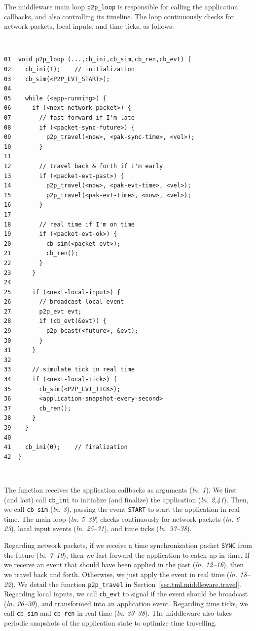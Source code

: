 \documentclass[sn-mathphys,iicol]{sn-jnl}%
\newcommand{\code}[1]  {\texttt{\small{#1}}}
\newcommand{\lin}[1]{(\emph{ln. #1}\xspace)}
\begin{document}
The middleware main loop \code{p2p\_loop} is responsible for calling the
application callbacks, and also controlling its timeline.
The loop continuously checks for network packets, local inputs, and time ticks,
as follows:

{\footnotesize
~
\begin{verbatim}
01  void p2p_loop (...,cb_ini,cb_sim,cb_ren,cb_evt) {
02    cb_ini(1);    // initialization
03    cb_sim(<P2P_EVT_START>);
04
05    while (<app-running>) {
06      if (<next-network-packet>) {
07        // fast forward if I'm late
08        if (<packet-sync-future>) {
09          p2p_travel(<now>, <pak-sync-time>, <vel>);
10        }
11
12        // travel back & forth if I'm early
13        if (<packet-evt-past>) {
14          p2p_travel(<now>, <pak-evt-time>, <vel>);
15          p2p_travel(<pak-evt-time>, <now>, <vel>);
16        }
17
18        // real time if I'm on time
19        if (<packet-evt-ok>) {
20          cb_sim(<packet-evt>);
21          cb_ren();
22        }
23      }
24
25      if (<next-local-input>) {
26        // broadcast local event
27        p2p_evt evt;
28        if (cb_evt(&evt)) {
29          p2p_bcast(<future>, &evt);
30        }
31      }
32
33      // simulate tick in real time
34      if (<next-local-tick>) {
35        cb_sim(<P2P_EVT_TICK>);
36        <application-snapshot-every-second>
37        cb_ren();
38      }
39    }
40
41    cb_ini(0);    // finalization
42  }
\end{verbatim}
~
}

The function receives the application callbacks as arguments \lin{1}.
We first (and last) call \code{cb\_ini} to initialize (and finalize) the
application \lin{2,41}.
Then, we call \code{cb\_sim} \lin{3}, passing the event \code{START} to start
the application in real time.
The main loop \lin{5--39} checks continuously for network packets \lin{6--23},
local input events \lin{25--31}, and time ticks \lin{33--38}.

Regarding network packets, if we receive a time synchronization packet
\code{SYNC} from the future \lin{7--10}, then we fast forward the application
to catch up in time. %
If we receive an event that should have been applied in the past \lin{12--16},
then we travel back and forth. %
Otherwise, we just apply the event in real time \lin{18--22}.
We detail the function \code{p2p\_travel} in
Section~\ref{sec.tml.middleware.travel}.
%
Regarding local inputs, we call \code{cb\_evt} to signal if the event should be
broadcast \lin{26--30}, and transformed into an application event.
%
Regarding time ticks, we call \code{cb\_sim} and \code{cb\_ren} in real time
\lin{33--38}.
The middleware also takes periodic snapshots of the application state to
optimize time travelling. %
\end{document}
